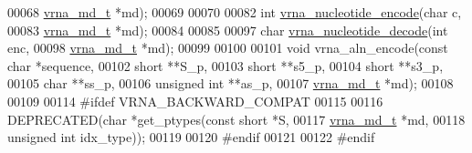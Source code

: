 \begin{DoxyCode}
00068                               \hyperlink{group__model__details_structvrna__md__s}{vrna\_md\_t}   *md);
00069 
00070 
00082 \textcolor{keywordtype}{int} \hyperlink{group__utils_gac12bf00123f88621c9be847b0879c1fb}{vrna\_nucleotide\_encode}(\textcolor{keywordtype}{char}       c,
00083                            \hyperlink{group__model__details_structvrna__md__s}{vrna\_md\_t}  *md);
00084 
00085 
00097 \textcolor{keywordtype}{char} \hyperlink{group__utils_ga48ef585e697be9c8a08ed68c655e29b6}{vrna\_nucleotide\_decode}(\textcolor{keywordtype}{int}       enc,
00098                             \hyperlink{group__model__details_structvrna__md__s}{vrna\_md\_t} *md);
00099 
00100 
00101 \textcolor{keywordtype}{void} vrna\_aln\_encode(\textcolor{keyword}{const} \textcolor{keywordtype}{char}   *sequence,
00102                      \textcolor{keywordtype}{short}        **S\_p,
00103                      \textcolor{keywordtype}{short}        **s5\_p,
00104                      \textcolor{keywordtype}{short}        **s3\_p,
00105                      \textcolor{keywordtype}{char}         **ss\_p,
00106                      \textcolor{keywordtype}{unsigned} \textcolor{keywordtype}{int} **as\_p,
00107                      \hyperlink{group__model__details_structvrna__md__s}{vrna\_md\_t}    *md);
00108 
00109 
00114 \textcolor{preprocessor}{#ifdef  VRNA\_BACKWARD\_COMPAT}
00115 
00116 DEPRECATED(\textcolor{keywordtype}{char} *get\_ptypes(\textcolor{keyword}{const} \textcolor{keywordtype}{short}   *S,
00117                             \hyperlink{group__model__details_structvrna__md__s}{vrna\_md\_t}     *md,
00118                             \textcolor{keywordtype}{unsigned} \textcolor{keywordtype}{int}  idx\_type));
00119 
00120 \textcolor{preprocessor}{#endif}
00121 
00122 \textcolor{preprocessor}{#endif}
\end{DoxyCode}
